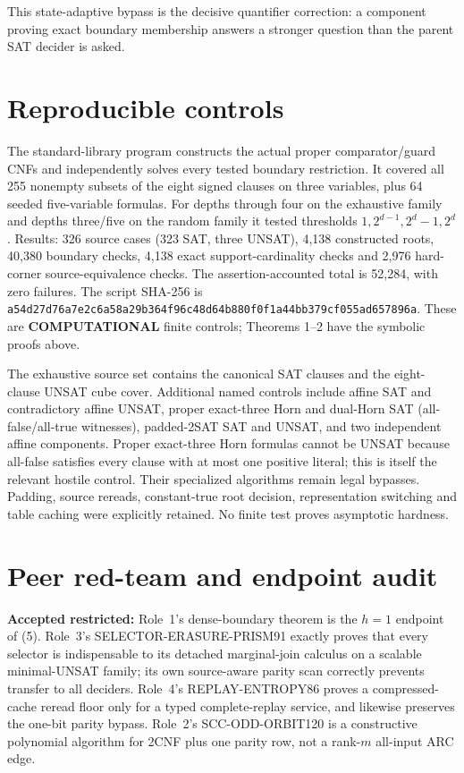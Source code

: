 \documentclass[11pt]{article}
\begin{document}
This state-adaptive bypass is the decisive quantifier correction: a
component proving exact boundary membership answers a stronger question
than the parent SAT decider is asked.

\section{Reproducible controls}
The standard-library program
 constructs the
actual proper comparator/guard CNFs and independently solves every tested
boundary restriction.  It covered all 255 nonempty subsets of the eight
signed clauses on three variables, plus 64 seeded five-variable formulas.
For depths through four on the exhaustive family and depths three/five on
the random family it tested thresholds $1,2^{d-1},2^d-1,2^d$.  Results:
326 source cases (323 SAT, three UNSAT), 4,138 constructed roots, 40,380
boundary checks, 4,138 exact support-cardinality checks and 2,976 hard-corner
source-equivalence checks.  The assertion-accounted total is 52,284, with
zero failures.  The script SHA-256 is
\texttt{a54d27d76a7e2c6a58a29b364f96c48d64b880f0f1a44bb379cf055ad657896a}.
These are \textbf{COMPUTATIONAL} finite controls; Theorems 1--2 have the
symbolic proofs above.

The exhaustive source set contains the canonical SAT clauses and the
eight-clause UNSAT cube cover.  Additional named controls include affine
SAT and contradictory affine UNSAT, proper exact-three Horn and dual-Horn
SAT (all-false/all-true witnesses), padded-2SAT SAT and UNSAT, and two
independent affine components.  Proper exact-three Horn formulas cannot be
UNSAT because all-false satisfies every clause with at most one positive
literal; this is itself the relevant hostile control.  Their specialized
algorithms remain legal bypasses.  Padding, source rereads, constant-true
root decision, representation switching and table caching were explicitly
retained.  No finite test proves asymptotic hardness.

\section{Peer red-team and endpoint audit}
\textbf{Accepted restricted:} Role~1's dense-boundary theorem is the
$h=1$ endpoint of (5).  Role~3's SELECTOR-ERASURE-PRISM91 exactly proves
that every selector is indispensable to its detached marginal-join
calculus on a scalable minimal-UNSAT family; its own source-aware parity
scan correctly prevents transfer to all deciders.  Role~4's
REPLAY-ENTROPY86 proves a compressed-cache reread floor only for a typed
complete-replay service, and likewise preserves the one-bit parity bypass.
Role~2's SCC-ODD-ORBIT120 is a constructive polynomial algorithm for 2CNF
plus one parity row, not a rank-$m$ all-input ARC edge.
\end{document}
